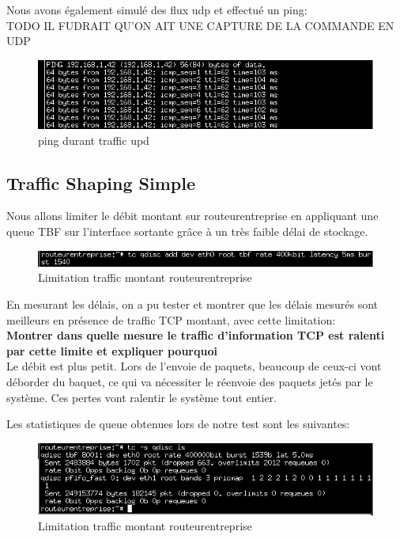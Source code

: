 \documentclass{article}
\begin{document}
Nous avons également simulé des flux udp et effectué un ping:\\
TODO IL FUDRAIT QU'ON AIT UNE CAPTURE DE LA COMMANDE EN UDP

\begin{figure}[h]
  \centering
  \includegraphics[width=\linewidth]{./captures/10-udp.png}
  \caption{ping durant traffic upd}
  \label{fig:token-bucket}
\end{figure}
\newpage


\subsection{Traffic Shaping Simple}
Nous allons limiter le débit montant sur routeurentreprise en appliquant une queue TBF sur l'interface sortante grâce à un très faible délai de stockage.
\begin{figure}[h]
  \centering
  \includegraphics[width=\linewidth]{./captures/11-limite.png}
  \caption{Limitation traffic montant routeurentreprise}
  \label{fig:token-bucket}
\end{figure}

En mesurant les délais, on a pu tester et montrer que les délais mesurés sont meilleurs en présence de traffic TCP montant, avec cette limitation:
\\

\textbf{Montrer dans quelle mesure le traffic d'information TCP est ralenti par cette limite et expliquer pourquoi}\\
Le débit est plus petit. Lors de l'envoie de paquets, beaucoup de ceux-ci vont déborder du baquet, ce qui va nécessiter le réenvoie des paquets jetés par le système. Ces pertes vont ralentir le système tout entier.

Les statistiques de queue obtenues lors de notre test sont les suivantes:
\begin{figure}[h]
  \centering
  \includegraphics[width=\linewidth]{./captures/13-stat-queue.png}
  \caption{Limitation traffic montant routeurentreprise}
  \label{fig:token-bucket}
\end{figure}
\end{document}
